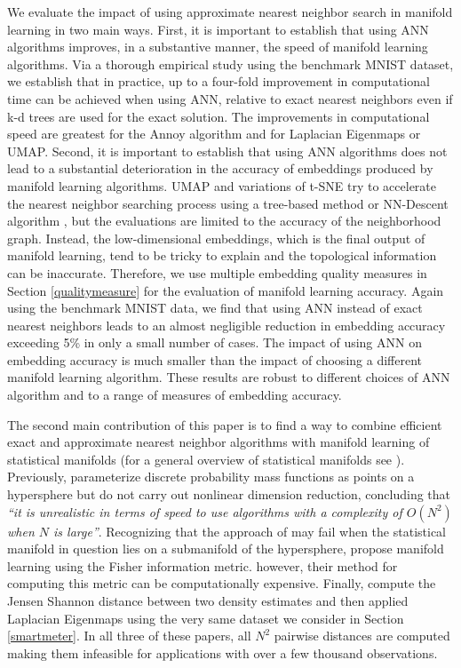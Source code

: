 \documentclass[11pt,a4paper,]{article}
\begin{document}
We evaluate the impact of using approximate nearest neighbor search in manifold learning in two main ways. First, it is important to establish that using ANN algorithms improves, in a substantive manner, the speed of manifold learning algorithms. Via a thorough empirical study using the benchmark MNIST dataset, we establish that in practice, up to a four-fold improvement in computational time can be achieved when using ANN, relative to exact nearest neighbors even if k-d trees are used for the exact solution. The improvements in computational speed are greatest for the Annoy algorithm and for Laplacian Eigenmaps or UMAP. Second, it is important to establish that using ANN algorithms does not lead to a substantial deterioration in the accuracy of embeddings produced by manifold learning algorithms. UMAP \autocite{McInnes2018-xo} and variations of t-SNE \autocite{Van_Der_Maaten2014-in,Tang2016-ho} try to accelerate the nearest neighbor searching process using a tree-based method or NN-Descent algorithm \autocite{Dong2011-ee}, but the evaluations are limited to the accuracy of the neighborhood graph. Instead, the low-dimensional embeddings, which is the final output of manifold learning, tend to be tricky to explain and the topological information can be inaccurate. Therefore, we use multiple embedding quality measures in Section \ref{qualitymeasure} for the evaluation of manifold learning accuracy. Again using the benchmark MNIST data, we find that using ANN instead of exact nearest neighbors leads to an almost negligible reduction in embedding accuracy exceeding 5\% in only a small number of cases. The impact of using ANN on embedding accuracy is much smaller than the impact of choosing a different manifold learning algorithm. These results are robust to different choices of ANN algorithm and to a range of measures of embedding accuracy.

The second main contribution of this paper is to find a way to combine efficient exact and approximate nearest neighbor algorithms with manifold learning of statistical manifolds (for a general overview of statistical manifolds see \textcite{Amari2016-hk}). Previously, \textcite{Lee2007-qa} parameterize discrete probability mass functions as points on a hypersphere but do not carry out nonlinear dimension reduction, concluding that \emph{``it is unrealistic in terms of speed to use algorithms with a complexity of \(O(N^2)\) when \(N\) is large''}. Recognizing that the approach of \textcite{Lee2007-qa} may fail when the statistical manifold in question lies on a submanifold of the hypersphere, \textcite{Carter2009-ti} propose manifold learning using the Fisher information metric. however, their method for computing this metric can be computationally expensive. Finally, \textcite{Hyndman2018-ia} compute the Jensen Shannon distance between two density estimates and then applied Laplacian Eigenmaps using the very same dataset we consider in Section \ref{smartmeter}. In all three of these papers, all \(N^2\) pairwise distances are computed making them infeasible for applications with over a few thousand observations.
\end{document}
